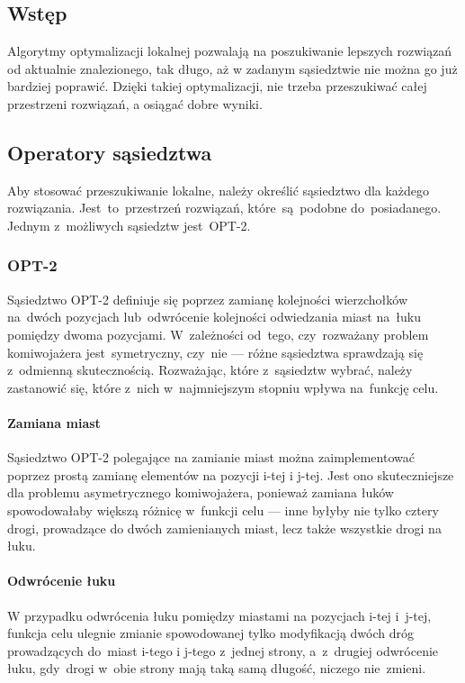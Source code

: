 \subsection{Wstęp}

Algorytmy optymalizacji lokalnej pozwalają na poszukiwanie lepszych rozwiązań od aktualnie znalezionego, tak długo, aż w zadanym sąsiedztwie nie można go już bardziej poprawić. Dzięki takiej optymalizacji, nie trzeba przeszukiwać całej przestrzeni rozwiązań, a osiągać dobre wyniki. 

\subsection{Operatory sąsiedztwa}

Aby stosować przeszukiwanie lokalne, należy określić sąsiedztwo dla każdego rozwiązania. Jest~to~przestrzeń rozwiązań, które~są~podobne do~posiadanego. Jednym z~możliwych sąsiedztw jest~OPT-2.

\subsubsection{OPT-2}

Sąsiedztwo OPT-2 definiuje się poprzez zamianę kolejności wierzchołków na~dwóch pozycjach lub~odwrócenie kolejności odwiedzania miast na~łuku pomiędzy dwoma pozycjami. W~zależności od~tego, czy~rozważany problem komiwojażera jest~symetryczny, czy~nie --- różne sąsiedztwa sprawdzają się z~odmienną skutecznością. Rozważając, które z~sąsiedztw wybrać, należy zastanowić się, które z~nich w~najmniejszym stopniu wpływa na~funkcję celu.

\paragraph{Zamiana miast}

Sąsiedztwo OPT-2 polegające na zamianie miast można zaimplementować poprzez prostą zamianę elementów na pozycji i-tej i j-tej. Jest ono skuteczniejsze dla problemu asymetrycznego komiwojażera, ponieważ zamiana łuków spowodowałaby większą różnicę w~funkcji celu --- inne byłyby nie tylko cztery drogi, prowadzące do dwóch zamienianych miast, lecz także wszystkie drogi na łuku.

\paragraph{Odwrócenie łuku}

W przypadku odwrócenia łuku pomiędzy miastami na pozycjach i-tej i~j-tej, funkcja celu ulegnie zmianie spowodowanej tylko modyfikacją dwóch dróg prowadzących do~miast i-tego i j-tego z~jednej strony, a~z~drugiej odwrócenie łuku, gdy~drogi w~obie strony mają taką samą długość, niczego nie~zmieni.


